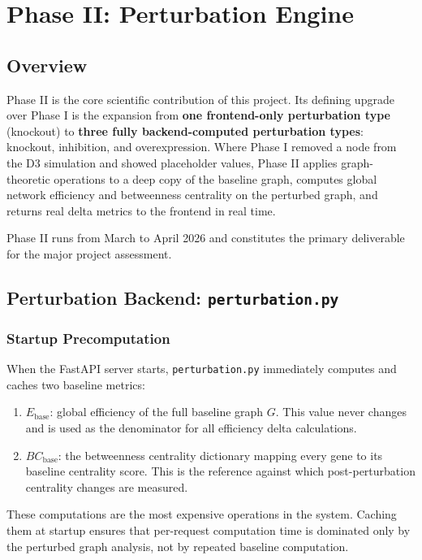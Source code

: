 \documentclass[12pt,a4paper]{report}
\begin{document}
\chapter{Phase II: Perturbation Engine}

\section{Overview}

Phase II is the core scientific contribution of this project. Its defining upgrade over Phase I is the expansion from \textbf{one frontend-only perturbation type} (knockout) to \textbf{three fully backend-computed perturbation types}: knockout, inhibition, and overexpression. Where Phase I removed a node from the D3 simulation and showed placeholder values, Phase II applies graph-theoretic operations to a deep copy of the baseline graph, computes global network efficiency and betweenness centrality on the perturbed graph, and returns real delta metrics to the frontend in real time.

Phase II runs from March to April 2026 and constitutes the primary deliverable for the major project assessment.

\section{Perturbation Backend: \texttt{perturbation.py}}

\subsection{Startup Precomputation}

When the FastAPI server starts, \texttt{perturbation.py} immediately computes and caches two baseline metrics:
\begin{enumerate}
  \item $E_{\text{base}}$: global efficiency of the full baseline graph $G$. This value never changes and is used as the denominator for all efficiency delta calculations.
  \item $\mathit{BC}_{\text{base}}$: the betweenness centrality dictionary mapping every gene to its baseline centrality score. This is the reference against which post-perturbation centrality changes are measured.
\end{enumerate}
These computations are the most expensive operations in the system. Caching them at startup ensures that per-request computation time is dominated only by the perturbed graph analysis, not by repeated baseline computation.
\end{document}
